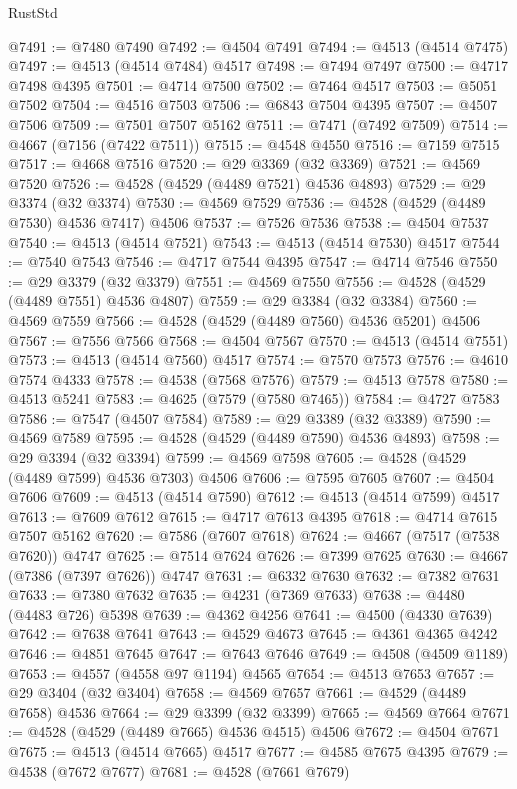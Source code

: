 \begin{lexlean}{RustStd}
\begin{coremodule}
@7491 := @7480 @7490
@7492 := @4504 @7491
@7494 := @4513 (@4514 @7475)
@7497 := @4513 (@4514 @7484) @4517
@7498 := @7494 @7497
@7500 := @4717 @7498 @4395
@7501 := @4714 @7500
@7502 := @7464 @4517
@7503 := @5051 @7502
@7504 := @4516 @7503
@7506 := @6843 @7504 @4395
@7507 := @4507 @7506
@7509 := @7501 @7507 @5162
@7511 := @7471 (@7492 @7509)
@7514 := @4667 (@7156 (@7422 @7511))
@7515 := @4548 @4550
@7516 := @7159 @7515
@7517 := @4668 @7516
@7520 := @29 @3369 (@32 @3369)
@7521 := @4569 @7520
@7526 := @4528 (@4529 (@4489 @7521) @4536 @4893)
@7529 := @29 @3374 (@32 @3374)
@7530 := @4569 @7529
@7536 := @4528 (@4529 (@4489 @7530) @4536 @7417) @4506
@7537 := @7526 @7536
@7538 := @4504 @7537
@7540 := @4513 (@4514 @7521)
@7543 := @4513 (@4514 @7530) @4517
@7544 := @7540 @7543
@7546 := @4717 @7544 @4395
@7547 := @4714 @7546
@7550 := @29 @3379 (@32 @3379)
@7551 := @4569 @7550
@7556 := @4528 (@4529 (@4489 @7551) @4536 @4807)
@7559 := @29 @3384 (@32 @3384)
@7560 := @4569 @7559
@7566 := @4528 (@4529 (@4489 @7560) @4536 @5201) @4506
@7567 := @7556 @7566
@7568 := @4504 @7567
@7570 := @4513 (@4514 @7551)
@7573 := @4513 (@4514 @7560) @4517
@7574 := @7570 @7573
@7576 := @4610 @7574 @4333
@7578 := @4538 (@7568 @7576)
@7579 := @4513 @7578
@7580 := @4513 @5241
@7583 := @4625 (@7579 (@7580 @7465))
@7584 := @4727 @7583
@7586 := @7547 (@4507 @7584)
@7589 := @29 @3389 (@32 @3389)
@7590 := @4569 @7589
@7595 := @4528 (@4529 (@4489 @7590) @4536 @4893)
@7598 := @29 @3394 (@32 @3394)
@7599 := @4569 @7598
@7605 := @4528 (@4529 (@4489 @7599) @4536 @7303) @4506
@7606 := @7595 @7605
@7607 := @4504 @7606
@7609 := @4513 (@4514 @7590)
@7612 := @4513 (@4514 @7599) @4517
@7613 := @7609 @7612
@7615 := @4717 @7613 @4395
@7618 := @4714 @7615 @7507 @5162
@7620 := @7586 (@7607 @7618)
@7624 := @4667 (@7517 (@7538 @7620)) @4747
@7625 := @7514 @7624
@7626 := @7399 @7625
@7630 := @4667 (@7386 (@7397 @7626)) @4747
@7631 := @6332 @7630
@7632 := @7382 @7631
@7633 := @7380 @7632
@7635 := @4231 (@7369 @7633)
@7638 := @4480 (@4483 @726) @5398
@7639 := @4362 @4256
@7641 := @4500 (@4330 @7639)
@7642 := @7638 @7641
@7643 := @4529 @4673
@7645 := @4361 @4365 @4242
@7646 := @4851 @7645
@7647 := @7643 @7646
@7649 := @4508 (@4509 @1189)
@7653 := @4557 (@4558 @97 @1194) @4565
@7654 := @4513 @7653
@7657 := @29 @3404 (@32 @3404)
@7658 := @4569 @7657
@7661 := @4529 (@4489 @7658) @4536
@7664 := @29 @3399 (@32 @3399)
@7665 := @4569 @7664
@7671 := @4528 (@4529 (@4489 @7665) @4536 @4515) @4506
@7672 := @4504 @7671
@7675 := @4513 (@4514 @7665) @4517
@7677 := @4585 @7675 @4395
@7679 := @4538 (@7672 @7677)
@7681 := @4528 (@7661 @7679)

\end{coremodule}
\end{lexlean}
